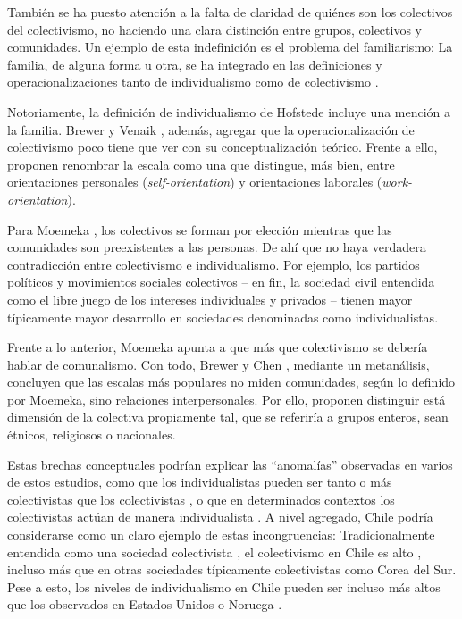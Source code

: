 \documentclass[12pt,twoside]{templates/facsothesis}
\begin{document}
También se ha puesto atención a la falta de claridad de quiénes son los colectivos del colectivismo, no haciendo una clara distinción entre grupos, colectivos y comunidades. Un ejemplo de esta indefinición es el problema del familiarismo: La familia, de alguna forma u otra, se ha integrado en las definiciones y operacionalizaciones tanto de individualismo como de colectivismo \citep{oyserman2002}.

Notoriamente, la definición de individualismo de Hofstede incluye una mención a la familia. Brewer y Venaik \citeyearpar{brewer2011}, además, agregar que la operacionalización de colectivismo poco tiene que ver con su conceptualización teórico. Frente a ello, proponen renombrar la escala como una que distingue, más bien, entre orientaciones personales (\emph{self-orientation}) y orientaciones laborales (\emph{work-orientation}).

Para Moemeka \citeyearpar{moemeka1998}, los colectivos se forman por elección mientras que las comunidades son preexistentes a las personas. De ahí que no haya verdadera contradicción entre colectivismo e individualismo. Por ejemplo, los partidos políticos y movimientos sociales colectivos -- en fin, la sociedad civil entendida como el libre juego de los intereses individuales y privados \citep{arribas1999} -- tienen mayor típicamente mayor desarrollo en sociedades denominadas como individualistas.

Frente a lo anterior, Moemeka \citeyearpar{moemeka1998} apunta a que más que colectivismo se debería hablar de comunalismo. Con todo, Brewer y Chen \citeyearpar{brewer2007}, mediante un metanálisis, concluyen que las escalas más populares no miden comunidades, según lo definido por Moemeka, sino relaciones interpersonales. Por ello, proponen distinguir está dimensión de la colectiva propiamente tal, que se referiría a grupos enteros, sean étnicos, religiosos o nacionales.

Estas brechas conceptuales podrían explicar las ``anomalías'' observadas en varios de estos estudios, como que los individualistas pueden ser tanto o más colectivistas que los colectivistas \citep{oyserman2002}, o que en determinados contextos los colectivistas actúan de manera individualista \citep{voronov2002}. A nivel agregado, Chile podría considerarse como un claro ejemplo de estas incongruencias: Tradicionalmente entendida como una sociedad colectivista \citep{rojas2008}, el colectivismo en Chile es alto \citep{oyserman2002}, incluso más que en otras sociedades típicamente colectivistas como Corea del Sur. Pese a esto, los niveles de individualismo en Chile pueden ser incluso más altos que los observados en Estados Unidos \citep{oyserman2002} o Noruega \citep{kolstad2009}.
\end{document}
